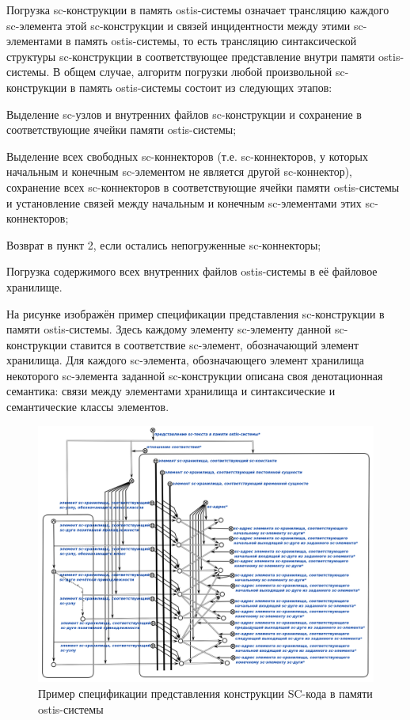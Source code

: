 Погрузка sc-конструкции в память ostis-системы означает трансляцию каждого sc-элемента этой sc-конструкции и связей инцидентности между этими sc-элементами в память ostis-системы, то есть трансляцию синтаксической структуры sc-конструкции в соответствующее представление внутри памяти ostis-системы. В общем случае, алгоритм погрузки любой произвольной sc-конструкции в память ostis-системы состоит из следующих этапов:
\begin{textitemize}
    \item Выделение sc-узлов и внутренних файлов sc-конструкции и сохранение в соответствующие ячейки памяти ostis-системы;
    \item Выделение всех свободных sc-коннекторов (т.е. sc-коннекторов, у которых начальным и конечным sc-элементом не является другой sc-коннектор), сохранение всех sc-коннекторов в соответствующие ячейки памяти ostis-системы и установление связей между начальным и конечным sc-элементами этих sc-коннекторов;
    \item Возврат в пункт 2, если остались непогруженные sc-коннекторы;
    \item Погрузка содержимого всех внутренних файлов ostis-системы в её файловое хранилище.
\end{textitemize}

На рисунке  изображён пример спецификации представления sc-конструкции в памяти ostis-системы. Здесь каждому элементу sc-элементу данной sc-конструкции ставится в соответствие sc-элемент, обозначающий элемент хранилища. Для каждого sc-элемента, обозначающего элемент хранилища некоторого sc-элемента заданной sc-конструкции описана своя денотационная семантика: связи между элементами хранилища и  синтаксические и семантические классы элементов.

\begin{figure}[htbp]
  \center
  \includegraphics[scale=0.55]{author/part6/figures/sc_code_in_memory_representation.png}
  \caption{Пример спецификации представления конструкции SC-кода в памяти ostis-системы}
  \label{fig:sc_code_in_memory_representation}
\end{figure}

